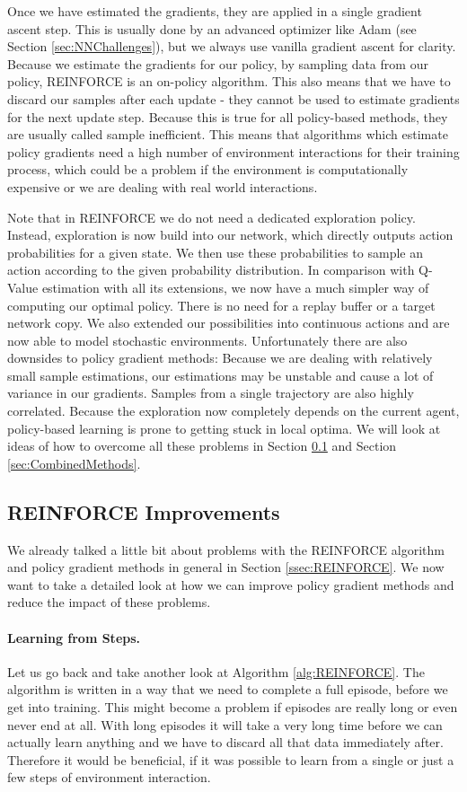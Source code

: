 Once we have estimated the gradients, they are applied in a single gradient ascent step. This is usually done by an advanced optimizer like Adam (see Section \ref{sec:NNChallenges}), but we always use vanilla gradient ascent for clarity. Because we estimate the gradients for our policy, by sampling data from our policy, REINFORCE is an on-policy algorithm. This also means that we have to discard our samples after each update - they cannot be used to estimate gradients for the next update step. Because this is true for all policy-based methods, they are usually called sample inefficient. This means that algorithms which estimate policy gradients need a high number of environment interactions for their training process, which could be a problem if the environment is computationally expensive or we are dealing with real world interactions.

Note that in REINFORCE we do not need a dedicated exploration policy. Instead, exploration is now build into our network, which directly outputs action probabilities for a given state. We then use these probabilities to sample an action according to the given probability distribution. In comparison with Q-Value estimation with all its extensions, we now have a much simpler way of computing our optimal policy. There is no need for a replay buffer or a target network copy. We also extended our possibilities into continuous actions and are now able to model stochastic environments. Unfortunately there are also downsides to policy gradient methods: Because we are dealing with relatively small sample estimations, our estimations may be unstable and cause a lot of variance in our gradients. Samples from a single trajectory are also highly correlated. Because the exploration now completely depends on the current agent, policy-based learning is prone to getting stuck in local optima. We will look at ideas of how to overcome all these problems in Section \ref{ssec:ImprovingPG} and Section \ref{sec:CombinedMethods}.

\subsection{REINFORCE Improvements} \label{ssec:ImprovingPG}
We already talked a little bit about problems with the REINFORCE algorithm and policy gradient methods in general in Section \ref{ssec:REINFORCE}. We now want to take a detailed look at how we can improve policy gradient methods and reduce the impact of these problems.

\paragraph{Learning from Steps.}
Let us go back and take another look at Algorithm \ref{alg:REINFORCE}. The algorithm is written in a way that we need to complete a full episode, before we get into training. This might become a problem if episodes are really long or even never end at all. With long episodes it will take a very long time before we can actually learn anything and we have to discard all that data immediately after. Therefore it would be beneficial, if it was possible to learn from a single or just a few steps of environment interaction. 

